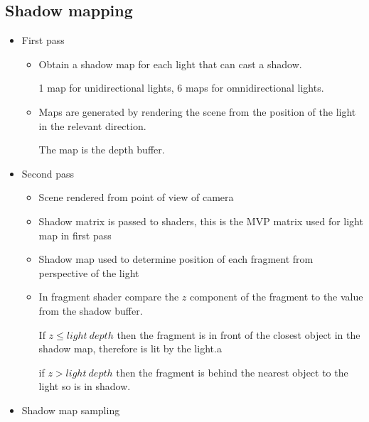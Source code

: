 \documentclass[a4paper]{article}
\begin{document}
\subsection{Shadow mapping}

\begin{itemize}
  \item
    First pass

    \begin{itemize}
      \item
        Obtain a shadow map for each light that can cast a shadow.

        1 map for unidirectional lights, 6 maps for omnidirectional lights.

      \item
        Maps are generated by rendering the scene from the position of the light
        in the relevant direction.

        The map is the depth buffer.

      \end{itemize}

    \item
      Second pass

      \begin{itemize}
        \item
          Scene rendered from point of view of camera

        \item
          Shadow matrix is passed to shaders, this is the MVP matrix used for
          light map in first pass

        \item
          Shadow map used to determine position of each fragment from
          perspective of the light

        \item
          In fragment shader compare the $z$ component of the fragment to the
          value from the shadow buffer.

          If $z \leq light \: depth$ then the fragment is in front of the
          closest object in the shadow map, therefore is lit by the light.a

          if $z > light \: depth$ then the fragment is behind the nearest object
          to the light so is in shadow.

      \end{itemize}

    \item
      Shadow map sampling


\end{itemize}
\end{document}
